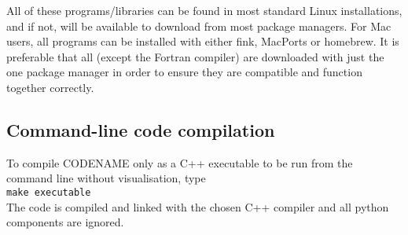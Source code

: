 \documentclass[a4paper]{article}
\newcommand{\var}[1]{\texttt{#1}}
\begin{document}
All of these programs/libraries can be found in most standard Linux installations, and if not, will be available to download from most package managers.  For Mac users, all programs can be installed with either fink, MacPorts or homebrew.  It is preferable that all (except the Fortran compiler) are downloaded with just the one package manager in order to ensure they are compatible and function together correctly.



\subsection{Command-line code compilation}

To compile CODENAME only as a C++ executable to be run from the command line without visualisation, type \\
\newline
\noindent \var{make executable} \\

\noindent The code is compiled and linked with the chosen C++ compiler and all python components are ignored.


\end{document}
